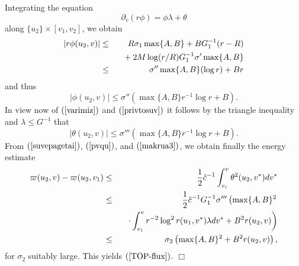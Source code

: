 \documentclass{article}
\begin{document}
Integrating the equation
\begin{equation}
\label{e3is}
\partial_v(r\phi)=\phi\lambda+\theta
\end{equation}
along $\{u_2\}\times[v_1,v_2]$, we obtain
\begin{eqnarray}
\label{prwtoprob}
\nonumber
|r\phi(u_2,v)|	&\le&	R\sigma_1\max\{A,B\}+BG_1^{-1}(r-R)\\
		&   &	\hbox{\ \ }+
					2M\log(r/R)G_1^{-1}\sigma'\max\{A,B\}\\
		&\le&	 \sigma''\max\{A,B\}(\log{r})+Br
\end{eqnarray}
and
thus
\begin{equation}
\label{privtosuv}
|\phi(u_2,v)|\le  \sigma''\left(\max\{A,B\}r^{-1}\log r+B\right).
\end{equation}
In view now of $(\ref{varimiz})$ and $(\ref{privtosuv})$ it follows
by the triangle inequality and $\lambda\le G^{-1}$ that
\begin{equation}
\label{suvepagetai}
|\theta(u_2,v)|\le \sigma'''\left(\max\{A,B\}r^{-1}\log r+B\right).
\end{equation}
From $(\ref{suvepagetai})$, $(\ref{pvqu})$, and $(\ref{makrua3})$,
 we obtain finally the energy 
estimate
\begin{eqnarray*}
\varpi(u_2,v)-\varpi(u_2,v_1)	&\le&	\frac12\hat{c}^{-1}\int_{v_i}^v{\theta^2(u_2,v^*)dv^*}\\
				&\le&	\frac12\hat{c}^{-1}G_1^{-1}\sigma'''
						\left(\max\{A,B\}^2\right.\\
				&   &	\hbox{\ \ }\left.\cdot
						\int_{v_1}^v{r^{-2}\log^2 r(u_1,v^*)\lambda dv^*}
						+B^2r(u_2,v)\right)\\
				&\le&	\sigma_2\left(\max\{A,B\}^2+
						B^2r(u_2,v)\right),
\end{eqnarray*}
for $\sigma_2$ suitably large. This yields $(\ref{TOP-flux})$.
$\Box$
\end{document}
